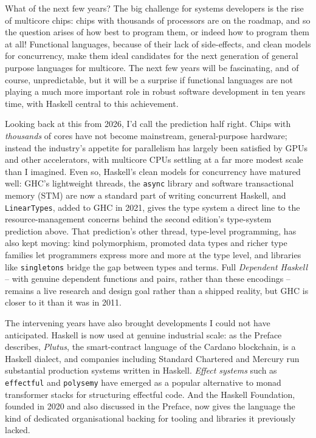What of the next few years? The big challenge for systems developers is the rise of multicore chips: chips with thousands of processors are on the roadmap, and so the question arises of how best to program them, or indeed how to program them at all! Functional languages, because of their lack of side-effects, and clean models for concurrency, make them ideal candidates for the next generation of general purpose languages for multicore. The next few years will be fascinating, and of course, unpredictable, but it will be a surprise if functional languages are not playing a much more important role in robust software development in ten years time, with Haskell central to this achievement.

Looking back at this from 2026, I'd call the prediction half right. Chips with \emph{thousands} of cores have not become mainstream, general-purpose hardware; instead the industry's appetite for parallelism has largely been satisfied by GPUs and other accelerators, with multicore CPUs settling at a far more modest scale than I imagined. Even so, Haskell's clean models for concurrency have matured well: GHC's lightweight threads, the \texttt{async} library and software transactional memory (STM) are now a standard part of writing concurrent Haskell, and \texttt{LinearTypes}, added to GHC in 2021, gives the type system a direct line to the resource-management concerns behind the second edition's type-system prediction above. That prediction's other thread, type-level programming, has also kept moving: kind polymorphism, promoted data types and richer type families let programmers express more and more at the type level, and libraries like \texttt{singletons} bridge the gap between types and terms. Full \emph{Dependent Haskell} -- with genuine dependent functions and pairs, rather than these encodings -- remains a live research and design goal rather than a shipped reality, but GHC is closer to it than it was in 2011.

The intervening years have also brought developments I could not have anticipated. Haskell is now used at genuine industrial scale: as the Preface describes, \emph{Plutus}, the smart-contract language of the Cardano blockchain, is a Haskell dialect, and companies including Standard Chartered and Mercury run substantial production systems written in Haskell. \emph{Effect systems} such as \texttt{effectful} and \texttt{polysemy} have emerged as a popular alternative to monad transformer stacks for structuring effectful code. And the Haskell Foundation, founded in 2020 and also discussed in the Preface, now gives the language the kind of dedicated organisational backing for tooling and libraries it previously lacked.


%
